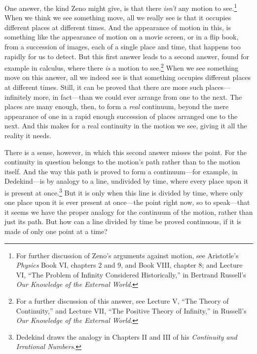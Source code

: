 \documentclass[12pt]{memoir}
\begin{document}
One answer, the kind Zeno might give, is that
there \emph{isn't} any motion to see.\footnote{For
further discussion of Zeno's arguments against
motion, see Aristotle's \emph{Physics} Book VI,
chapters 2 and 9, and Book VIII, chapter 8; and
Lecture VI, ``The Problem of Infinity Considered
Historically,'' in Bertrand Russell's \emph{Our
Knowledge of the External World}.} When we think
we see something move, all we really see is
that it occupies different places at different
times. And the appearance of motion in this, is
something like the appearance of motion on a movie
screen, or in a flip book, from a succession of
images, each of a single place and time, that
happens too rapidly for us to detect. But this
first answer leads to a second answer, found for
example in calculus, where there \emph{is} a
motion to see.\footnote{For a further discussion
of this answer, see Lecture V, ``The Theory of
Continuity,'' and Lecture VII, ``The Positive
Theory of Infinity,'' in Russell's \emph{Our
Knowledge of the External World}.} When we see
something move on this answer, all we indeed see
is that something occupies different places at
different times. Still, it can be proved that
there are more such places---infinitely more, in
fact---than we could ever arrange from one to the
next. The places are many enough, then, to form a
\emph{real} continuum, beyond the mere appearance
of one in a rapid enough succession of places
arranged one to the next. And this makes for a
real continuity in the motion we see, giving it
all the reality it needs.

There is a sense, however, in which this second
answer misses the point. For the continuity in
question belongs to the motion's path rather
than to the motion itself. And the way this path
is proved to form a continuum---for example, in
Dedekind---is by analogy to a line, undivided
by time, where every place upon it is present
at once.\footnote{Dedekind draws the analogy in
Chapters II and III of his \emph{Continuity and
Irrational Numbers}.} But it is only when this
line is divided by time, where only one place upon
it is ever present at once---the point right now,
so to speak---that it seems we have the proper
analogy for the continuum of the motion, rather
than just its path. But how can a line divided
by time be proved continuous, if it is made of
only one point at a time?
\end{document}
